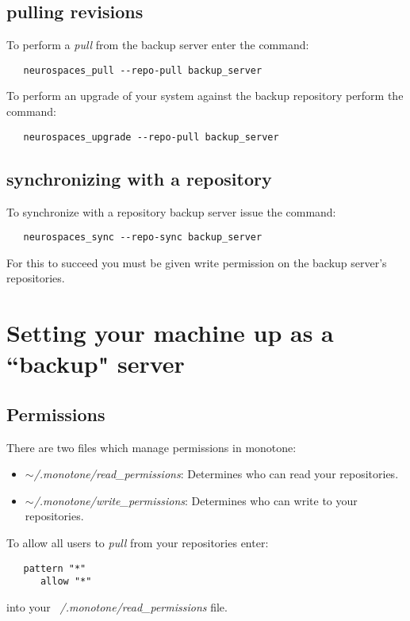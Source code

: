 \documentclass[12pt]{article}
\begin{document}
\subsection*{pulling revisions}

To perform a {\it pull} from the backup server enter the command:
\begin{verbatim}
   neurospaces_pull --repo-pull backup_server
\end{verbatim}
To perform an upgrade of your system against the backup repository perform the command:
\begin{verbatim}
   neurospaces_upgrade --repo-pull backup_server
\end{verbatim}

\subsection*{synchronizing with a repository}

To synchronize with a repository backup server issue the command:
\begin{verbatim}
   neurospaces_sync --repo-sync backup_server
\end{verbatim}

For this to succeed you must be given write permission on the backup server's repositories.

\section*{Setting your machine up as a ``backup" server}

\subsection*{Permissions}

There are two files which manage permissions in monotone:
\begin{itemize}
   \item[]{\it $\sim$/.monotone/read\_permissions}: Determines who can read your repositories. 
   \item[]{\it $\sim$/.monotone/write\_permissions}: Determines who can write to your repositories. 
\end{itemize}
To allow all users to {\it pull} from your repositories enter:
\begin{verbatim}
   pattern "*"  
      allow "*"
\end{verbatim}
into your {\it ~/.monotone/read\_permissions} file.
\end{document}
